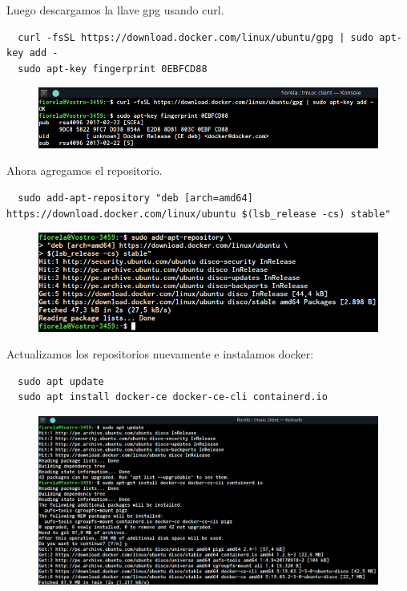 \documentclass{article}
\begin{document}
Luego descargamos la llave gpg usando curl.\\

\begin{verbatim}
  curl -fsSL https://download.docker.com/linux/ubuntu/gpg | sudo apt-key add -
  sudo apt-key fingerprint 0EBFCD88
\end{verbatim}

\begin{figure}[h!]
  \centering
  \includegraphics[scale=0.75]{./Pictures/Devilbox/002_docker.png}
\end{figure}

Ahora agregamos el repositorio.\\

\begin{verbatim}
  sudo add-apt-repository "deb [arch=amd64] https://download.docker.com/linux/ubuntu $(lsb_release -cs) stable"
\end{verbatim}

\newpage

\begin{figure}[h!]
  \centering
  \includegraphics[scale=0.75]{./Pictures/Devilbox/003_docker.png}
\end{figure}

Actualizamos los repositorios nuevamente e instalamos docker:

\begin{verbatim}
  sudo apt update
  sudo apt install docker-ce docker-ce-cli containerd.io
\end{verbatim}

\begin{figure}[h!]
  \centering
  \includegraphics[scale=0.65]{./Pictures/Devilbox/004_docker.png}
\end{figure}
\end{document}
